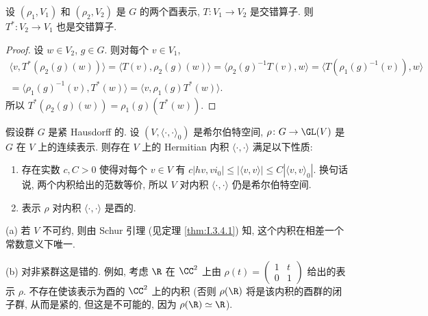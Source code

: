 \begin{lemma}[交错算子的伴随]
\label{lem:I.3.2.7}
设 $(\rho_1, V_1)$ 和 $(\rho_2, V_2)$ 是 $G$ 的两个酉表示, $T \colon V_1 \to V_2$ 是交错算子. 则 $T^* \colon V_2 \to V_1$ 也是交错算子.
\end{lemma}

\begin{proof}
设 $w \in V_2$, $g \in G$. 则对每个 $v \in V_1$,
\begin{multline*}
\langle v, T^*(\rho_2(g)(w)) \rangle = \langle T(v), \rho_2(g)(w) \rangle = \langle \rho_2(g)^{-1}T(v), w \rangle = \langle T(\rho_1(g)^{-1}(v)), w \rangle \\
= \langle \rho_1(g)^{-1}(v), T^*(w) \rangle = \langle v, \rho_1(g)T^*(w) \rangle.
\end{multline*}
所以 $T^*(\rho_2(g)(w)) = \rho_1(g)(T^*(w))$.
\end{proof}

\begin{theorem}[平均化内积]
\label{thm:I.3.2.8}
假设群 $G$ 是紧 Hausdorff 的. 设 $(V, \langle \cdot, \cdot \rangle_0)$ 是希尔伯特空间, $\rho \colon G \to \GL(V)$ 是 $G$ 在 $V$ 上的连续表示. 则存在 $V$ 上的 Hermitian 内积 $\langle \cdot, \cdot \rangle$ 满足以下性质:
\begin{enumerate}
\item[(1)] 存在实数 $c, C > 0$ 使得对每个 $v \in V$ 有 $c|hv, vi_0| \leq |\langle v, v \rangle| \leq C|\langle v, v \rangle_0|$. 换句话说, 两个内积给出的范数等价, 所以 $V$ 对内积 $\langle \cdot, \cdot \rangle$ 仍是希尔伯特空间.
\item[(2)] 表示 $\rho$ 对内积 $\langle \cdot, \cdot \rangle$ 是酉的.
\end{enumerate}
\end{theorem}

\begin{remarkstar}[I.3.1]
(a) 若 $V$ 不可约, 则由 Schur 引理 (见定理 \ref{thm:I.3.4.1}) 知, 这个内积在相差一个常数意义下唯一.

(b) 对非紧群这是错的. 例如, 考虑 $\R$ 在 $\CC^2$ 上由 $\rho(t) = \begin{pmatrix} 1 & t \\ 0 & 1 \end{pmatrix}$ 给出的表示 $\rho$. 不存在使该表示为酉的 $\CC^2$ 上的内积 (否则 $\rho(\R)$ 将是该内积的酉群的闭子群, 从而是紧的, 但这是不可能的, 因为 $\rho(\R) \simeq \R$).
\end{remarkstar}

